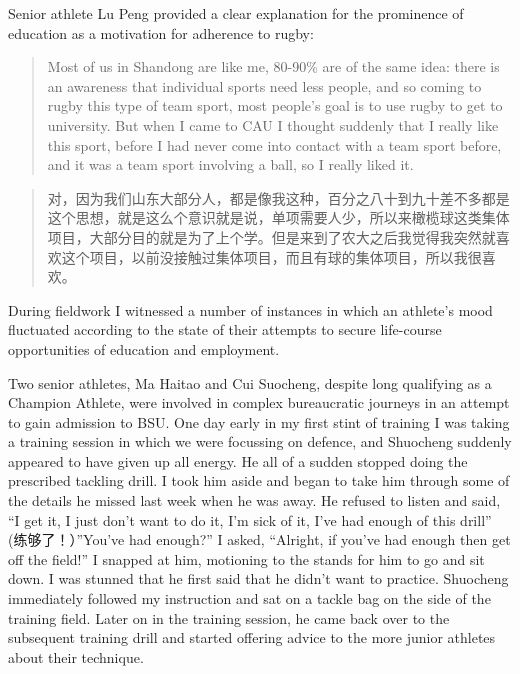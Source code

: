 \begin{CJK}{UTF8}{gbsn}
Senior athlete Lu Peng provided a clear explanation for the prominence of education as a motivation for adherence to rugby:

\begin{quotation}
  Most of us in Shandong are like me, 80-90\% are of the same idea: there is an awareness that individual sports need less people, and so coming to rugby this type of team sport, most people’s goal is to use rugby to get to university.  But when I came to CAU I thought suddenly that I really like this sport, before I had never come into contact with a team sport before, and it was a team sport involving a ball, so I really liked it.
\end{quotation}

\begin{quotation}
  对，因为我们山东大部分人，都是像我这种，百分之八十到九十差不多都是这个思想，就是这么个意识就是说，单项需要人少，所以来橄榄球这类集体项目，大部分目的就是为了上个学。但是来到了农大之后我觉得我突然就喜欢这个项目，以前没接触过集体项目，而且有球的集体项目，所以我很喜欢。
\end{quotation}

During fieldwork I witnessed a number of instances in which an athlete's mood fluctuated according to the state of their attempts to secure life-course opportunities of education and employment.

Two senior athletes, Ma Haitao and Cui Suocheng, despite long qualifying as a Champion Athlete, were involved in complex bureaucratic journeys in an attempt to gain admission to BSU.  One day early in my first stint of training I was taking a training session in which we were focussing on defence, and Shuocheng suddenly appeared to have given up all energy.  He all of a sudden stopped doing the prescribed tackling drill.  I took him aside and began to take him through some of the details he missed last week when he was away.  He refused to listen and said, ``I get it, I just don’t want to do it, I’m sick of it, I’ve had enough of this drill'' (练够了！）''You’ve had enough?'' I asked, ``Alright, if you’ve had enough then get off the field!''  I snapped at him, motioning to the stands for him to go and sit down. I was stunned that he first said that he didn’t want to practice.  Shuocheng immediately followed my instruction and sat on a tackle bag on the side of the training field.  Later on in the training session, he came back over to the subsequent training drill and started offering advice to the more junior athletes about their technique.


\end{CJK}
